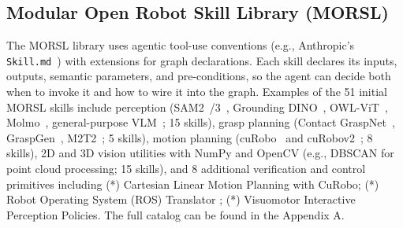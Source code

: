\subsection{Modular Open Robot Skill Library (MORSL)}
The MORSL library uses agentic tool-use conventions (e.g., Anthropic's
\texttt{Skill.md}~\cite{anthropicskill}) with extensions for graph declarations. Each skill declares its inputs, outputs, semantic parameters, and pre-conditions, so the agent can decide both when to invoke it and how to wire it into the graph. Examples of the 51 initial MORSL skills include perception (SAM2~\cite{ravi2024sam}/3~\cite{carion2025sam3segmentconcepts}, Grounding DINO~\cite{liu2023grounding}, OWL-ViT~\cite{minderer2022simple}, Molmo~\cite{deitke2024molmo}, general-purpose VLM~\cite{geminiroboticsteam2025geminiroboticsbringingai, kamath2025gemma}; 15 skills), grasp planning (Contact GraspNet~\cite{sundermeyer2021contact}, GraspGen~\cite{murali2025graspgen}, M2T2~\cite{yuan2023m2t2}; 5 skills), motion planning (cuRobo~\cite{sundaralingam2023curobo} and cuRobov2~\cite{sundaralingam2026curobov2}; 8 skills), 2D and 3D vision  utilities with NumPy and OpenCV (e.g., DBSCAN for point cloud processing; 15 skills), and 8 additional verification and control primitives including
(*) {Cartesian Linear Motion Planning with CuRobo}; 
(*) {Robot Operating System (ROS) Translator };  
(*) {Visuomotor Interactive Perception Policies}.  The full catalog can be found in the Appendix A.






